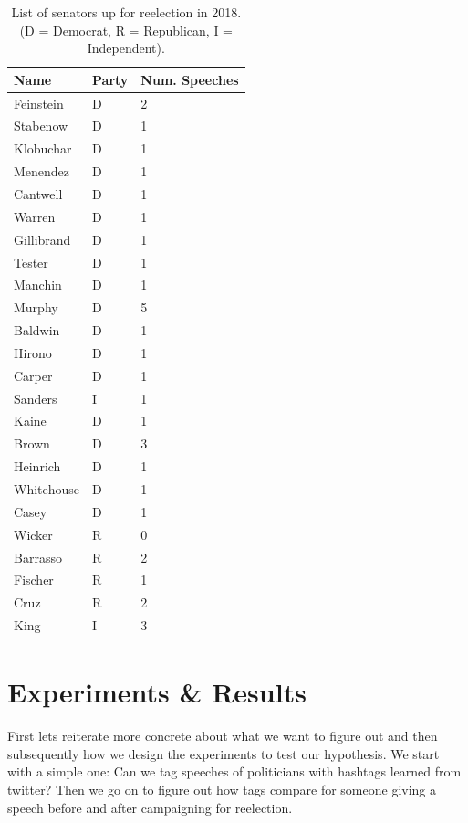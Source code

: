 \documentclass[10pt,conference,compsocconf]{IEEEtran}
\begin{document}
\begin{table}[]
	\centering
	\begin{tabular}{@{}lll@{}}
		\toprule
		Name       & Party      & Num. Speeches \\ \midrule
		Feinstein  & D   &       2        \\
		Stabenow   & D   &       1        \\
		Klobuchar  & D   &     1          \\
		Menendez   & D   &     1          \\
		Cantwell   & D   &      1         \\
		Warren     & D   &   1            \\
		Gillibrand & D   &        1       \\
		Tester     & D   &     1          \\
		Manchin    & D   &      1         \\
		Murphy     & D   &     5          \\
		Baldwin    & D   &       1        \\
		Hirono     & D   &        1       \\
		Carper     & D   &      1         \\
		Sanders    & I   &      1         \\
		Kaine      & D   &         1      \\
		Brown      & D   &      3         \\
		Heinrich   & D   &       1        \\
		Whitehouse & D   &     1          \\
		Casey      & D   &     1          \\
		Wicker     & R &         0      \\
		Barrasso   & R &    2           \\
		Fischer    & R &         1      \\
		Cruz       & R &      2         \\
		King       & I &     3          \\ \bottomrule
	\end{tabular}
	\caption{List of senators up for reelection in 2018. (D = Democrat, R = Republican, I = Independent).}
	\label{tbl:senators}
\end{table}


\section{Experiments \& Results}
\label{sec:Experiments}
First lets reiterate more concrete about what we want to figure out and then subsequently how we design the experiments to test our hypothesis. 
We start with a simple one: Can we tag speeches of politicians with hashtags learned from twitter? Then we go on to figure out how tags compare for someone giving a speech before and after campaigning for reelection. 
\end{document}
